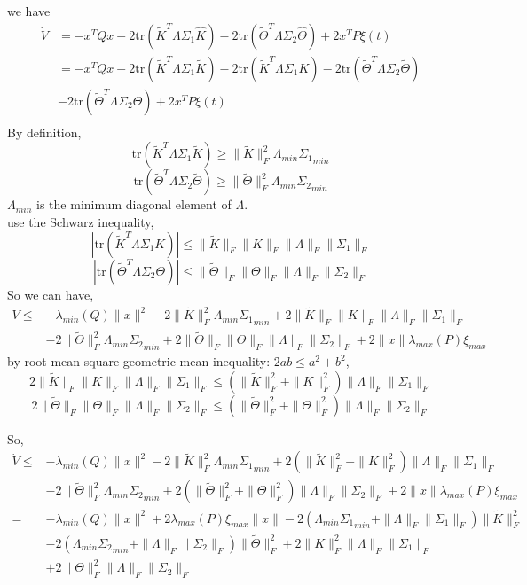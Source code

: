 we have 
\begin{align*}
    \dot{V}&=-x^TQx-2\text{tr}(\tilde{K}^T\Lambda\Sigma_1\hat{K})-2\text{tr}(\tilde{\Theta}^T\Lambda\Sigma_2\hat{\Theta})+2x^TP\xi(t)\\
    &=-x^TQx-2\text{tr}(\tilde{K}^T\Lambda\Sigma_1\tilde{K})-2\text{tr}(\tilde{K}^T\Lambda\Sigma_1 K)-2\text{tr}(\tilde{\Theta}^T\Lambda\Sigma_2\tilde{\Theta})\\&-2\text{tr}(\tilde{\Theta}^T\Lambda\Sigma_2\Theta)+2x^TP\xi(t)\\
\end{align*}
By definition,
$$\text{tr}(\tilde{K}^T\Lambda\Sigma_1\tilde{K})\geq\|\tilde{K}\|_F^2\Lambda_{min}{\Sigma_1}_{min}$$
$$\text{tr}(\tilde{\Theta}^T\Lambda\Sigma_2\tilde{\Theta})\geq\|\tilde{\Theta}\|_F^2\Lambda_{min}{\Sigma_2}_{min}$$
$\Lambda_{min}$ is the minimum diagonal element of $\Lambda$.\\
use the Schwarz inequality,
$$|\text{tr}(\tilde{K}^T\Lambda\Sigma_1 K)|\leq\|\tilde{K}\|_F\|K\|_F\|\Lambda\|_F\|\Sigma_1\|_F$$
$$|\text{tr}(\tilde{\Theta}^T\Lambda\Sigma_2\Theta)|\leq\|\tilde{\Theta}\|_F\|\Theta\|_F\|\Lambda\|_F\|\Sigma_2\|_F$$
So we can have,
\begin{align*}
    \dot{V}\leq&-\lambda_{min}(Q)\|x\|^2-2\|\tilde{K}\|_F^2\Lambda_{min}{\Sigma_1}_{min}+2\|\tilde{K}\|_F\|K\|_F\|\Lambda\|_F\|\Sigma_1\|_F\\
    &-2\|\tilde{\Theta}\|_F^2\Lambda_{min}{\Sigma_2}_{min}+2\|\tilde{\Theta}\|_F\|\Theta\|_F\|\Lambda\|_F\|\Sigma_2\|_F+2\|x\|\lambda_{max}(P)\xi_{max}
\end{align*}
by root mean square-geometric mean inequality:
        $2ab \leq a^2 + b^2$,
$$2\|\tilde{K}\|_F\|K\|_F\|\Lambda\|_F\|\Sigma_1\|_F\leq(\|\tilde{K}\|_F^2+\|K\|_F^2)\|\Lambda\|_F\|\Sigma_1\|_F$$
$$2\|\tilde{\Theta}\|_F\|\Theta\|_F\|\Lambda\|_F\|\Sigma_2\|_F\leq(\|\tilde{\Theta}\|_F^2+\|\Theta\|_F^2)\|\Lambda\|_F\|\Sigma_2\|_F$$

So, 
\begin{align*}
    \dot{V}\leq&-\lambda_{min}(Q)\|x\|^2-2\|\tilde{K}\|_F^2\Lambda_{min}{\Sigma_1}_{min}+2(\|\tilde{K}\|_F^2+\|K\|_F^2)\|\Lambda\|_F\|\Sigma_1\|_F\\
    &-2\|\tilde{\Theta}\|_F^2\Lambda_{min}{\Sigma_2}_{min}+2(\|\tilde{\Theta}\|_F^2+\|\Theta\|_F^2)\|\Lambda\|_F\|\Sigma_2\|_F+2\|x\|\lambda_{max}(P)\xi_{max}\\
    =&-\lambda_{min}(Q)\|x\|^2+2\lambda_{max}(P)\xi_{max}\|x\|-2(\Lambda_{min}{\Sigma_1}_{min}+\|\Lambda\|_F\|\Sigma_1\|_F)\|\tilde{K}\|_F^2\\
    &-2(\Lambda_{min}{\Sigma_2}_{min}+\|\Lambda\|_F\|\Sigma_2\|_F)\|\tilde{\Theta}\|_F^2+2\|K\|_F^2\|\Lambda\|_F\|\Sigma_1\|_F\\
    &+2\|\Theta\|_F^2\|\Lambda\|_F\|\Sigma_2\|_F
\end{align*}


